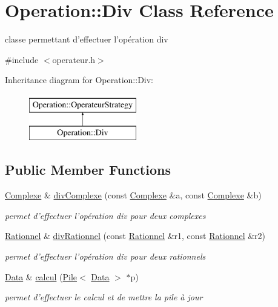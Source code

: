 \hypertarget{classOperation_1_1Div}{
\section{Operation::Div Class Reference}
\label{classOperation_1_1Div}
}


classe permettant d'effectuer l'opération div  




{\ttfamily \#include $<$operateur.h$>$}

Inheritance diagram for Operation::Div:\begin{figure}[H]
\begin{center}
\leavevmode
\includegraphics[height=2cm]{classOperation_1_1Div}
\end{center}
\end{figure}
\subsection*{Public Member Functions}
\begin{DoxyCompactItemize}
\item 
\hyperlink{classNombre_1_1Complexe}{Complexe} \& \hyperlink{classOperation_1_1Div_a32cea3648beaa64f84b33545a0c328f8}{divComplexe} (const \hyperlink{classNombre_1_1Complexe}{Complexe} \&a, const \hyperlink{classNombre_1_1Complexe}{Complexe} \&b)
\begin{DoxyCompactList}\small\item\em permet d'effectuer l'opération div pour deux complexes \item\end{DoxyCompactList}\item 
\hyperlink{classNombre_1_1Rationnel}{Rationnel} \& \hyperlink{classOperation_1_1Div_afbe5105e27ceea4490a71155c7229541}{divRationnel} (const \hyperlink{classNombre_1_1Rationnel}{Rationnel} \&r1, const \hyperlink{classNombre_1_1Rationnel}{Rationnel} \&r2)
\begin{DoxyCompactList}\small\item\em permet d'effectuer l'opération div pour deux rationnels \item\end{DoxyCompactList}\item 
\hyperlink{classNombre_1_1Data}{Data} \& \hyperlink{classOperation_1_1Div_a4530654b1b81fdeadb4f1532fcaea85d}{calcul} (\hyperlink{classPile}{Pile}$<$ \hyperlink{classNombre_1_1Data}{Data} $>$ $\ast$p)
\begin{DoxyCompactList}\small\item\em permet d'effectuer le calcul et de mettre la pile à jour \item\end{DoxyCompactList}\end{DoxyCompactItemize}


